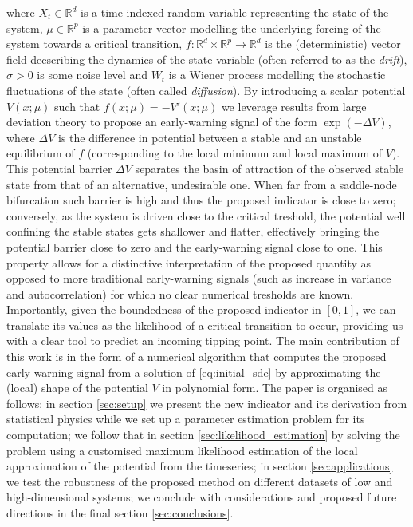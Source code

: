 \documentclass[openacc]{rsproca_new}
\begin{document}
where $X_{t}\in \mathbb{R}^{d}$ is a time-indexed random variable representing the state of the system, $\mu\in \mathbb{R}^{p}$ is a parameter vector modelling the underlying forcing of the system towards a critical transition, $f:\mathbb{R}^{d}\times \mathbb{R}^{p}\to \mathbb{R}^{d}$ is the (deterministic) vector field decscribing the dynamics of the state variable (often referred to as the \textit{drift}), $\sigma>0$ is some noise level and $W_{t}$ is a Wiener process modelling the stochastic fluctuations of the state (often called \textit{diffusion}).
By introducing a scalar potential $V(x;\mu)$ such that $f(x;\mu) = -V'(x;\mu)$ we leverage results from large deviation theory to propose an early-warning signal of the form $\exp(-\Delta V)$, where $\Delta V$ is the difference in potential between a stable and an unstable equilibrium of $f$ (corresponding to the local minimum and local maximum of $V$).
This potential barrier $\Delta V$ separates the basin of attraction of the observed stable state from that of an alternative, undesirable one. 
When far from a saddle-node bifurcation such barrier is high and thus the proposed indicator is close to zero; conversely, as the system is driven close to the critical treshold, the potential well confining the stable states gets shallower and flatter, effectively bringing the potential barrier close to zero and the early-warning signal close to one. 
This property allows for a distinctive interpretation of the proposed quantity as opposed to more traditional early-warning signals (such as increase in variance and autocorrelation) for which no clear numerical tresholds are known.
Importantly, given the boundedness of the proposed indicator in $[0,1]$, we can translate its values as the likelihood of a critical transition to occur, providing us with a clear tool to predict an incoming tipping point.
The main contribution of this work is in the form of a numerical algorithm that computes the proposed early-warning signal from a solution of \ref{eq:initial_sde} by approximating the (local) shape of the potential $V$ in polynomial form. 
The paper is organised as follows: 
in section \ref{sec:setup} we present the new indicator and its derivation from statistical physics while we set up a parameter estimation problem for its computation; 
we follow that in section \ref{sec:likelihood_estimation} by solving the problem using a customised maximum likelihood estimation of the local approximation of the potential from the timeseries; 
in section \ref{sec:applications} we test the robustness of the proposed method on different datasets of low and high-dimensional systems; 
we conclude with considerations and proposed future directions in the final section \ref{sec:conclusions}.
\end{document}
